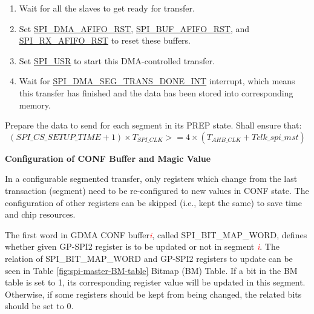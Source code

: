 \documentclass[main\_\_EN.tex]{subfiles}
\begin{document}
\begin{enumerate}
   \item Wait for all the slaves to get ready for transfer.

    \item Set \hyperref[fielddesc:SPIDMAAFIFORST]{SPI\_DMA\_AFIFO\_RST}, \hyperref[fielddesc:SPIBUFAFIFORST]{SPI\_BUF\_AFIFO\_RST}, and \hyperref[fielddesc:SPIRXAFIFORST]{SPI\_RX\_AFIFO\_RST} to reset these buffers.

   \item Set \hyperref[fielddesc:SPIUSR]{SPI\_USR} to start this DMA-controlled transfer.

   \item Wait for \hyperref[int:SPIDMASEGTRANSDONEINT]{SPI\_DMA\_SEG\_TRANS\_DONE\_INT} interrupt, which means this transfer has finished and the data has been stored into corresponding memory.
 \end{enumerate}

\begin{tiplisting}
\vspace{-2em}
Prepare the data to send for each segment in its PREP state. Shall ensure that:
\vspace{1em}
    \[
    (\hyperref[fielddesc:SPICSSETUPTIME]{SPI\_CS\_SETUP\_TIME} + 1) \times T_{SPI\_CLK} >= 4 \times (T_{AHB\_CLK} + Tclk\_spi\_mst)
    \]
\end{tiplisting}

\textbf{Configuration of CONF Buffer and Magic Value}\label{sec:SCT-CONF-Buffer}

In a configurable segmented transfer, only registers which change from the last transaction (segment) need to be re-configured to new values in CONF state. The configuration of other registers can be skipped (i.e., kept the same) to save time and chip resources.

The first word in GDMA CONF buffer\textcolor{red}{\it i}, called SPI\_BIT\_MAP\_WORD, defines whether given GP-SPI2 register is to be updated or not in segment \textcolor{red}{\it i}. The relation of SPI\_BIT\_MAP\_WORD and GP-SPI2 registers to update can be seen in Table \ref{fig:spi-master-BM-table} Bitmap (BM) Table. If a bit in the BM table is set to 1, its corresponding register value will be updated in this segment. Otherwise, if some registers should be kept from being changed, the related bits should be set to 0.
\end{document}
